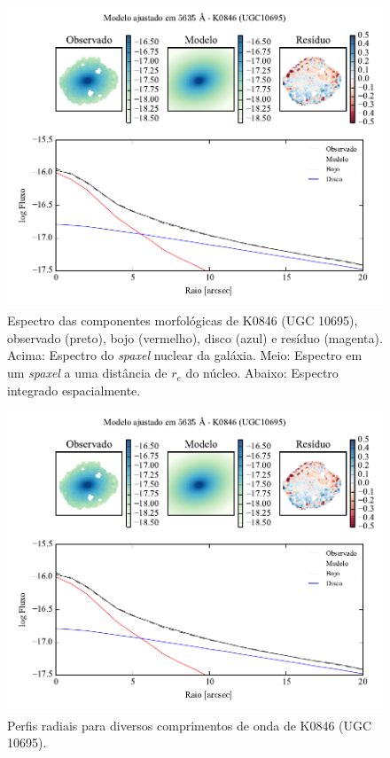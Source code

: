 \begin{figure}
	\includegraphics[page=4]{figuras-decomp/K0846_sample006a}
	\caption[Espectro das componentes morfológicas de K0846 (UGC 10695)]
	{Espectro das componentes morfológicas de K0846 (UGC 10695),
	observado (preto), bojo (vermelho), disco (azul) e resíduo (magenta). Acima:
	Espectro do {\em spaxel} nuclear da galáxia. Meio: Espectro em um {\em spaxel}
	a uma distância de $r_e$ do núcleo. Abaixo: Espectro integrado espacialmente.}
	\label{fig:decompSpectra:K0846}
\end{figure}

\begin{figure}
	\includegraphics[page=5]{figuras-decomp/K0846_sample006a}
	\caption[Perfis radiais para diversos comprimentos de onda de K0846 (UGC 10695)]
	{Perfis radiais para diversos comprimentos de onda de K0846 (UGC 10695).}
	\label{fig:decompRadprofSpec:K0846}
\end{figure}

